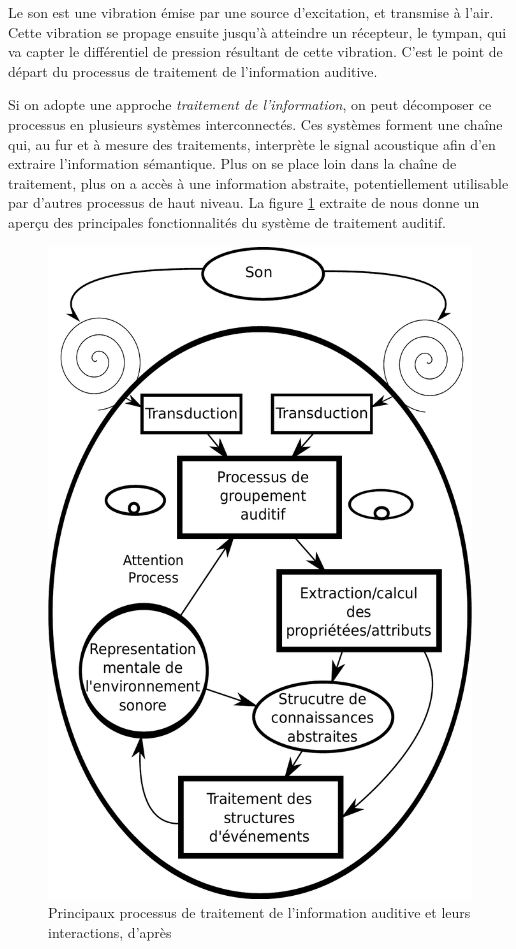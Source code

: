 Le son est une vibration émise par une source d'excitation, et transmise à l'air. Cette vibration se propage ensuite jusqu'à atteindre un récepteur, le tympan, qui va capter le différentiel de pression résultant de cette vibration. C'est le point de départ du processus de traitement de l'information auditive. 

Si on adopte une approche \emph{traitement de l'information}, on peut décomposer ce processus en plusieurs systèmes interconnectés. Ces systèmes forment une chaîne qui, au fur et à mesure des traitements, interprète le signal acoustique afin d'en extraire l'information sémantique. Plus on se place loin dans la chaîne de traitement, plus on a accès à une information abstraite, potentiellement utilisable par d'autres processus de haut niveau. La figure \ref{fig:traitementSonMcAdamsBigand} extraite de \citep{mcadams1994penser} nous donne un aperçu des principales fonctionnalités du système de traitement auditif.

\begin{figure}[t]
        \myfloatalign
        \includegraphics[width=.6\linewidth]{gfx/traitementSonMcAdamsBigand}
        \caption[Principaux processus de traitement de l'information auditive et leurs interactions]{Principaux processus de traitement de l'information auditive et leurs interactions, d'après \citep{mcadams1994penser}}\label{fig:traitementSonMcAdamsBigand}
\end{figure}

